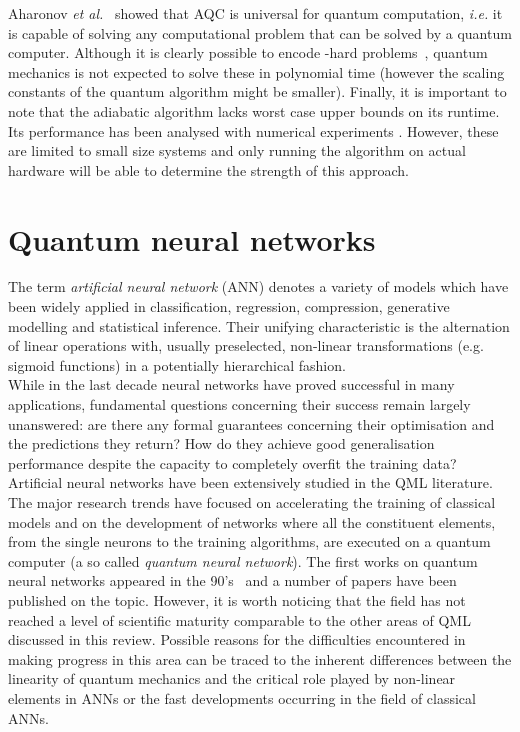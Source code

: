 \documentclass[a4paper, 11pt]{article}
\begin{document}
Aharonov \textit{et al.}~\cite{aharonov2008adiabatic} showed that AQC is universal for quantum computation, \textit{i.e.} it is capable of solving any computational problem that can be solved by a quantum computer. Although it is clearly possible to encode \NP-hard problems~\cite{barahona1982computational}, quantum mechanics is not expected to solve these in polynomial time (however the scaling constants of the quantum algorithm might be smaller). Finally, it is important to note that the adiabatic algorithm lacks worst case upper bounds on its runtime. Its performance has been analysed with numerical experiments \cite{farhi2000numerical,farhi2001quantum,farhi2012performance,hen2011exponential,young2008size,young2010first}. However, these are limited to small size systems and only running the algorithm on actual hardware will be able to determine the strength of this approach. 

\section{Quantum neural networks}
\label{sec:QNN}

The term \textit{artificial neural network} (ANN) denotes a variety of models which have been widely applied in classification, regression, compression, generative modelling and statistical inference. Their unifying characteristic is the alternation of linear operations with, usually preselected, non-linear transformations (e.g. sigmoid functions) in a potentially hierarchical fashion. \\

While in the last decade neural networks have proved successful in many applications, fundamental questions concerning their success remain largely unanswered: are there any formal guarantees concerning their optimisation and the predictions they return? How do they achieve good generalisation performance despite the capacity to completely overfit the training data?\\

Artificial neural networks have been extensively studied in the QML literature. The major research trends have focused on accelerating the training of classical models and on the development of networks where all the constituent elements, from the single neurons to the training algorithms, are executed on a quantum computer (a so called \textit{quantum neural network}). The first works on quantum neural networks appeared in the 90's~\cite{kak1995quantum} and a number of papers have been published on the topic. However, it is worth noticing that the field has not reached a level of scientific maturity comparable to the other areas of QML discussed in this review. Possible reasons for the difficulties encountered in making progress in this area can be traced to the inherent differences between the linearity of quantum mechanics and the critical role played by non-linear elements in ANNs or the fast developments occurring in the field of classical ANNs.\\
\end{document}
